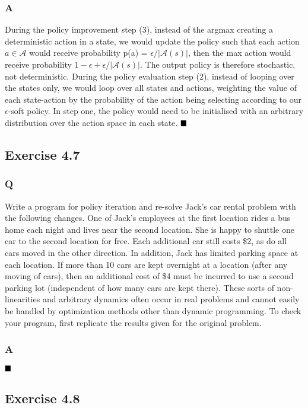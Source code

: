 \subsubsection{A}
During the policy improvement step (3), instead of the argmax creating a deterministic action in a state, we would update the policy such that each action $a \in \mathcal{A}$ would receive probability p(a) = $\epsilon /|\mathcal{A}(s)|$, then the max action would receive probability $1 - \epsilon + \epsilon /|\mathcal{A}(s)|$. The output policy is therefore stochastic, not deterministic. During the policy evaluation step (2), instead of looping over the states only, we would loop over all states and actions, weighting the value of each state-action by the probability of the action being selecting according to our $\epsilon$-soft policy. In step one, the policy would need to be initialised with an arbitrary distribution over the action space in each state.
$
\hfill \blacksquare
$

\subsection{Exercise 4.7}
\subsubsection{Q}
Write a program for policy iteration and re-solve Jack’s car rental problem with the following changes. One of Jack’s employees at the first location rides a bus home each night and lives near the second location. She is happy to shuttle one car to the second location for free. Each additional car still costs \$2, as do all cars moved in the other direction. In addition, Jack has limited parking space at each location. If more than 10 cars are kept overnight at a location (after any moving of cars), then an additional cost of \$4 must be incurred to use a second parking lot (independent of how many cars are kept there). These sorts of non-linearities and arbitrary dynamics often occur in real problems and cannot easily be handled by optimization methods other than dynamic programming. To check your program, first replicate the results given for the original problem.
\subsubsection{A}
\ProgrammingExercise
$
\hfill \blacksquare
$

\subsection{Exercise 4.8}
